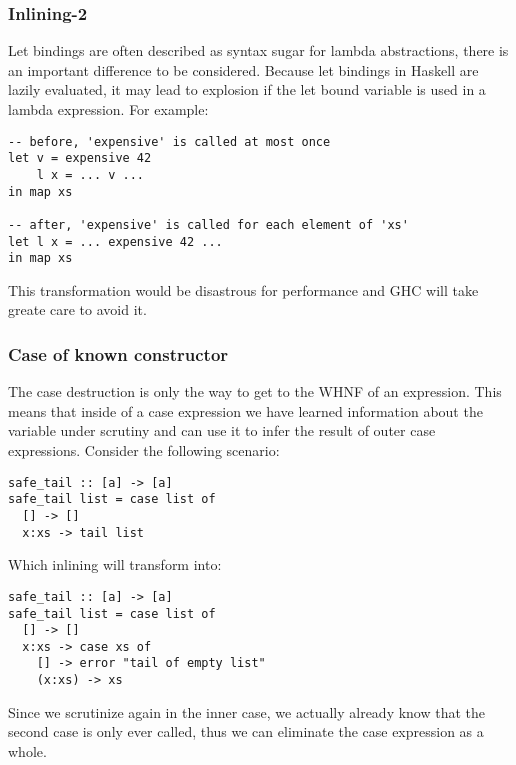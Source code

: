 \subsubsection{Inlining-2}

Let bindings are often described as syntax sugar for lambda abstractions, there is an important difference to be considered.
Because let bindings in Haskell are lazily evaluated, it may lead to explosion if the let bound variable is used in a lambda
expression. For example:

\begin{listing}[H]
\begin{verbatim}
-- before, 'expensive' is called at most once
let v = expensive 42
    l x = ... v ...
in map xs

-- after, 'expensive' is called for each element of 'xs'
let l x = ... expensive 42 ...
in map xs
\end{verbatim}
\end{listing}

This transformation would be disastrous for performance and GHC will take greate care to avoid it. 

\subsubsection{Case of known constructor}

The case destruction is only the way to get to the WHNF of an expression. This means that inside of a case expression
we have learned information about the variable under scrutiny and can use it to infer the result of outer case expressions.
Consider the following scenario:

\begin{listing}[H]
\begin{verbatim}
safe_tail :: [a] -> [a]
safe_tail list = case list of
  [] -> []
  x:xs -> tail list
\end{verbatim}
\end{listing}

Which inlining will transform into:

\begin{listing}[H]
\begin{verbatim}
safe_tail :: [a] -> [a]
safe_tail list = case list of
  [] -> []
  x:xs -> case xs of
    [] -> error "tail of empty list"
    (x:xs) -> xs
\end{verbatim}
\end{listing}

Since we scrutinize  again in the inner case, we actually already know that the second case is only ever called,
thus we can eliminate the case expression as a whole.

